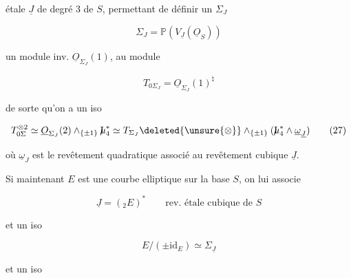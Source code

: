 étale $\underline J$ de degré $3$ de $S$, permettant de définir un $\Sigma_J$

\[
\Sigma_J=\mathbb P(V_{\underline J}(\underline O_S))
\tag*{(25)}
\]


 un module inv. $\underline O_{\Sigma_J}(1)$,  au module

\[
T_{0\Sigma_J}=\underline O_{\Sigma_J}(1)^{\natural}
\tag*{(26)}
\]

de sorte qu'on a un iso

\[
T_{0\Sigma}^{\otimes2}\simeq \underline O_{\Sigma_J}(2)\wedge_{\{\pm1\}}\mathord{\mathrm{I}\mkern-7mu\mu}_4^*
\simeq T_{\Sigma_J}\deleted{\unsure{\otimes}}\wedge_{\{\pm1\}}(\mathord{\mathrm{I}\mkern-7mu\mu}_4^*\wedge\underline\omega_{\underline J})
\tag*{(27)}
\]

où $\underline\omega_J$ est le revêtement  quadratique associé au revêtement  cubique $\underline J$.

Si maintenant $E$ est une courbe elliptique sur la base $S$, on lui associe

\[
\underline J=({}_2E)^*\qquad\text{rev. étale cubique de }S
\tag*{(28)}
\]

et  un iso

\[
E/(\pm\mathrm{id}_E)\simeq\Sigma_{\underline J}
\tag*{(29)}
\]

et un iso
